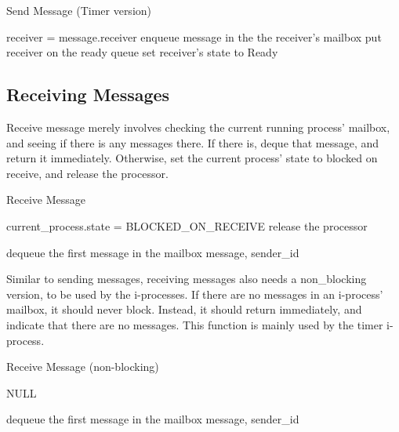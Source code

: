 \documentclass[12pt]{report}
\begin{document}
\begin{algorithm}[H]
	\caption{Send Message (Timer version)}
	\begin{algorithmic}[1]
			\State receiver = message.receiver
			\State enqueue message in the the receiver's mailbox
				\State put receiver on the ready queue
				\State set receiver's state to Ready
			\EndIf
		\EndFunction
	\end{algorithmic}
\end{algorithm}

\subsection{Receiving Messages}

Receive message merely involves checking the current running process' mailbox, and seeing if there is any messages there. If there is, deque that message, and return it immediately. Otherwise, set the current process' state to blocked on receive, and release the processor.

\begin{algorithm}[H]
	\caption{Receive Message}
	\begin{algorithmic}[1]
				\State current_process.state = BLOCKED_ON_RECEIVE
				\State release the processor
			\EndWhile

			\State dequeue the first message in the mailbox
			\State\Return message, sender_id
		\EndFunction
	\end{algorithmic}
\end{algorithm}

Similar to sending messages, receiving messages also needs a non_blocking version, to be used by the i-processes. If there are no messages in an i-process' mailbox, it should never block. Instead, it should return immediately, and indicate that there are no messages. This function is mainly used by the timer i-process.

\begin{algorithm}[H]
	\caption{Receive Message (non-blocking)}
	\begin{algorithmic}[1]
				\State\Return NULL
			\EndIf

			\State dequeue the first message in the mailbox
			\State\Return message, sender_id
		\EndFunction
	\end{algorithmic}
\end{algorithm}
\end{document}
